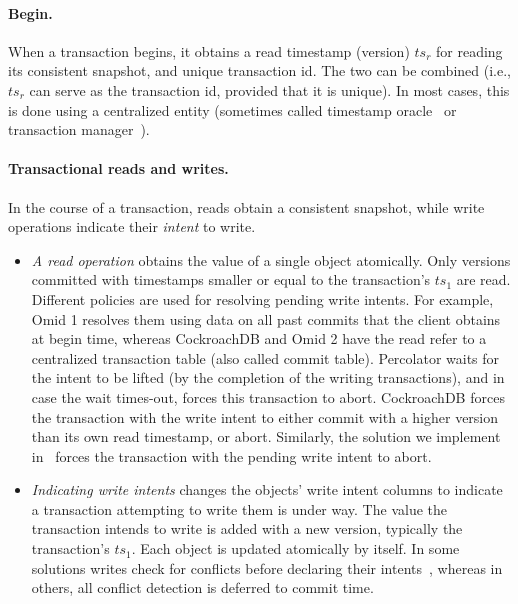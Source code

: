 \paragraph{Begin.} 
  When a transaction begins, it obtains a read timestamp (version) $ts_r$ for reading its consistent snapshot, and unique transaction id.
  The two can be combined (i.e., $ts_r$ can serve as the  transaction id, provided that it is unique).
  In most cases, this is done using a centralized entity (sometimes called timestamp oracle~\cite{Percolator2010,OmidICDE2014}
   or transaction manager~\cite{omid-blog}). 

  \paragraph{Transactional reads and writes.} 
 In the course of a transaction, reads  obtain a consistent snapshot,
 while write operations indicate their \emph{intent} to write. 
  	 	\begin{itemize}
  		\item  \emph{A read operation} obtains the value of a single object atomically. 
  		Only versions committed with timestamps  smaller or equal to the transaction's $ts_1$ are read. 
 		Different  policies are used for resolving pending write intents. For example, Omid 1 resolves them 
 		using data on all past commits that the client obtains at begin time, whereas CockroachDB and Omid 2 
 		have the read refer to a centralized transaction table (also called commit table). 
		Percolator  waits for the intent to be lifted (by the completion of the writing transactions), and in case the wait times-out, 
		forces this transaction to abort. 
	 	 CockroachDB forces the transaction with the write intent to either commit with a higher version 
  		than its own read timestamp, or abort. Similarly, the solution we implement in \sys\ forces the transaction with the pending write 
  		intent to abort. 
  		\item \emph{Indicating write intents} changes the objects' write intent columns
  		to indicate a transaction attempting to write them is under way. The value the
  		transaction intends to write is added with a new version, typically the transaction's $ts_1$.
		Each object is updated atomically by itself. 
		In some solutions writes check for conflicts before declaring their intents~\cite{cockroach}, whereas in others, 
		all conflict detection is deferred to commit time. 
  	\end{itemize}
